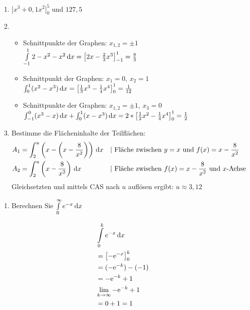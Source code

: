 \begin{lsg}{}
  \begin{enumerate}
    \item $\bigg[x^3 + 0,1 x^2\bigg]_0^5$ und $127,5$
    \item
    \begin{itemize}
      \item Schnittpunkte der Graphen: $x_{1,2}=\pm 1$\\ $\int\limits_{-1}^1 2-x^2-x^2\,\mathrm{d} x=\left[2x-\frac{2}{3}x^3\right]_{-1}^1=\frac 8 3$
      \item Schnittpunkt der Graphen: $x_1=0,\ x_2=1$ \\$\int_0^1 (x^2-x^3)\,\mathrm{d} x=\left[\frac{1}{3}x^3-\frac{1}{4}x^4\right]_0^1=\frac 1 {12}$
      \item Schnittpunkte der Graphen: $x_{1,2}=\pm 1,\ x_3=0$ \\$\int_{-1}^0 (x^3-x)\,\mathrm{d} x+\int_0^1 (x-x^3)\,\mathrm{d} x=2*\left[\frac{1}{2}x^2-\frac{1}{4}x^4\right]_0^1=\frac 1 2$
    \end{itemize}
		\item Bestimme die Flächeninhalte der Teilflächen:\begin{align*}
	  A_1&=\int_2^u\left(x-\left(x-\frac{8}{x^2}\right)\right)\d x&&|\ \text{Fläche zwischen $y=x$ und $f(x)=x-\frac{8}{x^2}$}\\
	  A_2&= \int_2^u\left(x-\frac{8}{x^2}\right)\d x&&|\ \text{Fläche zwischen $f(x)=x-\frac{8}{x^2}$ und $x$-Achse}
	  \end{align*}
	  Gleichsetzten und mittels CAS nach $u$ auflösen ergibt: $u\approx 3,12$
  \end{enumerate}
\end{lsg}



\begin{enumerate}
	\item Berechnen Sie $\int\limits^\infty_0 e^{-x}\,\mathrm{d} x$
\end{enumerate}
\begin{lsg}{}
	\begin{align*}
		&\int\limits^k_0 e^{-x}\,\mathrm{d} x\\
		&=\left[-\mathrm{e}^{-x}\right]_0^k\\
		&=(-\mathrm{e}^{-k})-(-1)\\
		&=-\mathrm{e}^{-k}+1\\
		&\lim\limits_{k\rightarrow \infty}-\mathrm{e}^{-k}+1\\
		&=0+1=1
	\end{align*}
\end{lsg}


